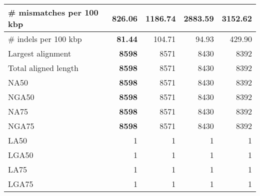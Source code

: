 \documentclass[12pt,a4paper]{article}
\begin{document}
\begin{table}[ht]
\begin{center}
\begin{tabular}{|l*{4}{|r}|}
\# mismatches per 100 kbp & {\bf 826.06} & 1186.74 & 2883.59 & 3152.62 \\ \hline
\# indels per 100 kbp & {\bf 81.44} & 104.71 & 94.93 & 429.90 \\ \hline
Largest alignment & {\bf 8598} & 8571 & 8430 & 8392 \\ \hline
Total aligned length & {\bf 8598} & 8571 & 8430 & 8392 \\ \hline
NA50 & {\bf 8598} & 8571 & 8430 & 8392 \\ \hline
NGA50 & {\bf 8598} & 8571 & 8430 & 8392 \\ \hline
NA75 & {\bf 8598} & 8571 & 8430 & 8392 \\ \hline
NGA75 & {\bf 8598} & 8571 & 8430 & 8392 \\ \hline
LA50 & 1 & 1 & 1 & 1 \\ \hline
LGA50 & 1 & 1 & 1 & 1 \\ \hline
LA75 & 1 & 1 & 1 & 1 \\ \hline
LGA75 & 1 & 1 & 1 & 1 \\ \hline
\end{tabular}
\end{center}
\end{table}
\end{document}
